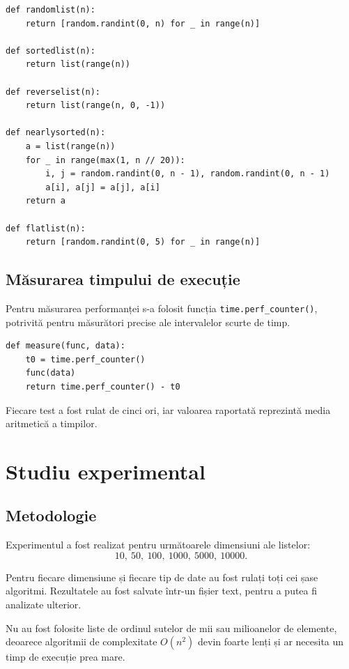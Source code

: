 \documentclass[a4paper,12pt]{article}
\begin{document}
\begin{lstlisting}[style=mypython, caption={Generarea datelor de test}]
def randomlist(n):
    return [random.randint(0, n) for _ in range(n)]

def sortedlist(n):
    return list(range(n))

def reverselist(n):
    return list(range(n, 0, -1))

def nearlysorted(n):
    a = list(range(n))
    for _ in range(max(1, n // 20)):
        i, j = random.randint(0, n - 1), random.randint(0, n - 1)
        a[i], a[j] = a[j], a[i]
    return a

def flatlist(n):
    return [random.randint(0, 5) for _ in range(n)]
\end{lstlisting}

\subsection{Măsurarea timpului de execuție}
Pentru măsurarea performanței s-a folosit funcția \texttt{time.perf\_counter()}, potrivită pentru măsurători precise ale intervalelor scurte de timp.

\begin{lstlisting}[style=mypython, caption={Măsurarea timpului de execuție}]
def measure(func, data):
    t0 = time.perf_counter()
    func(data)
    return time.perf_counter() - t0
\end{lstlisting}

Fiecare test a fost rulat de cinci ori, iar valoarea raportată reprezintă media aritmetică a timpilor.

\section{Studiu experimental}

\subsection{Metodologie}
Experimentul a fost realizat pentru următoarele dimensiuni ale listelor:
\[
10,\ 50,\ 100,\ 1000,\ 5000,\ 10000.
\]

Pentru fiecare dimensiune și fiecare tip de date au fost rulați toți cei șase algoritmi. Rezultatele au fost salvate într-un fișier text, pentru a putea fi analizate ulterior.

Nu au fost folosite liste de ordinul sutelor de mii sau milioanelor de elemente, deoarece algoritmii de complexitate $O(n^2)$ devin foarte lenți și ar necesita un timp de execuție prea mare.
\end{document}
